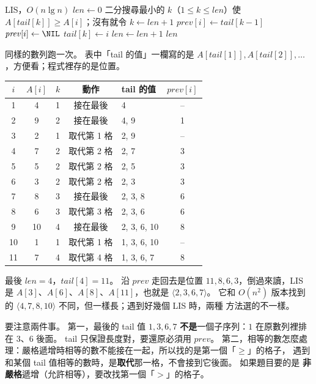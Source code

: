 \begin{pseudo}[label=alg:dp-lis-fast]{LIS，$O(n \lg n)$}
    \State $\mathit{len} \gets 0$
        \State 二分搜尋最小的 $k$（$1 \le k \le \mathit{len}$）使 $A[\mathit{tail}[k]] \ge A[i]$；沒有就令 $k \gets \mathit{len} + 1$
            \State $\mathit{prev}[i] \gets \mathit{tail}[k - 1]$
        \Else
            \State $\mathit{prev}[i] \gets \NIL$
        \EndIf
        \State $\mathit{tail}[k] \gets i$
            \State $\mathit{len} \gets \mathit{len} + 1$
        \EndIf
    \EndFor
    \State \Return $\mathit{len}$
\EndFunction
\end{pseudo}

同樣的數列跑一次。 表中「tail 的值」一欄寫的是 $A[\mathit{tail}[1]], A[\mathit{tail}[2]],
\ldots$，方便看；程式裡存的是位置。

\begin{center}
\begin{tabular}{cclclc}
\toprule
$i$ & $A[i]$ & $k$ & 動作 & tail 的值 & $\mathit{prev}[i]$ \\
\midrule
1 & 4 & 1 & 接在最後 & 4 & -- \\
2 & 9 & 2 & 接在最後 & 4, 9 & 1 \\
3 & 2 & 1 & 取代第 1 格 & 2, 9 & -- \\
4 & 7 & 2 & 取代第 2 格 & 2, 7 & 3 \\
5 & 5 & 2 & 取代第 2 格 & 2, 5 & 3 \\
6 & 3 & 2 & 取代第 2 格 & 2, 3 & 3 \\
7 & 8 & 3 & 接在最後 & 2, 3, 8 & 6 \\
8 & 6 & 3 & 取代第 3 格 & 2, 3, 6 & 6 \\
9 & 10 & 4 & 接在最後 & 2, 3, 6, 10 & 8 \\
10 & 1 & 1 & 取代第 1 格 & 1, 3, 6, 10 & -- \\
11 & 7 & 4 & 取代第 4 格 & 1, 3, 6, 7 & 8 \\
\bottomrule
\end{tabular}
\end{center}

最後 $\mathit{len} = 4$，$\mathit{tail}[4] = 11$。 沿 $\mathit{prev}$ 走回去是位置
$11, 8, 6, 3$，倒過來讀，LIS 是 $A[3]$、$A[6]$、$A[8]$、$A[11]$，也就是 $\langle 2, 3, 6, 7 \rangle$。
它和 $O(n^2)$ 版本找到的 $\langle 4, 7, 8, 10 \rangle$ 不同，但一樣長；遇到好幾個 LIS 時，兩種
方法選的不一樣。

要注意兩件事。 第一，最後的 tail 值 $1, 3, 6, 7$ \textbf{不是}一個子序列：$1$ 在原數列裡排在
$3$、$6$ 後面。 tail 只保證長度對，要還原必須用 $\mathit{prev}$。 第二，相等的數怎麼處理：嚴格遞增時相等的數不能接在一起，所以找的是第一個「$\ge$」的格子，
遇到和某個 tail 值相等的數時，是\textbf{取代}那一格，不會接到它後面。 如果題目要的是
\textbf{非嚴格}遞增（允許相等），要改找第一個「$>$」的格子。


